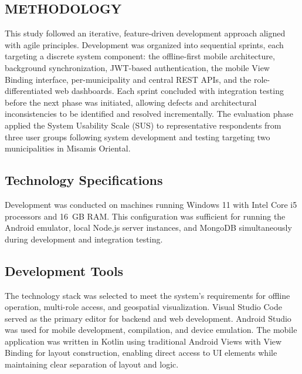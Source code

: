 \documentclass{icsthesis}
\begin{document}
\begin{mainmatter}
				
		
		\section{METHODOLOGY}
			This study followed an iterative, feature-driven development approach
aligned with agile principles. Development was organized into sequential sprints, each
targeting a discrete system component: the offline-first mobile architecture, background
synchronization, JWT-based authentication, the mobile View Binding interface,
per-municipality and central REST APIs, and the role-differentiated web dashboards. Each
sprint concluded with integration testing before the next phase was initiated, allowing
defects and architectural inconsistencies to be identified and resolved incrementally.
The evaluation phase applied the System Usability Scale (SUS) to representative
respondents from three user groups following system development and testing targeting
two municipalities in Misamis Oriental.

\subsection{Technology Specifications}

Development was conducted on machines running Windows 11 with Intel Core i5 processors
and 16~GB RAM. This configuration was sufficient for running the Android emulator, local
Node.js server instances, and MongoDB simultaneously during development and integration
testing.

\subsection{Development Tools}

The technology stack was selected to meet the system's requirements for offline operation,
multi-role access, and geospatial visualization. Visual Studio Code served as the primary
editor for backend and web development. Android Studio was used for mobile development,
compilation, and device emulation. The mobile application was written in Kotlin using
traditional Android Views with View Binding for layout construction, enabling direct
access to UI elements while maintaining clear separation of layout and logic.


\end{mainmatter}
\end{document}
